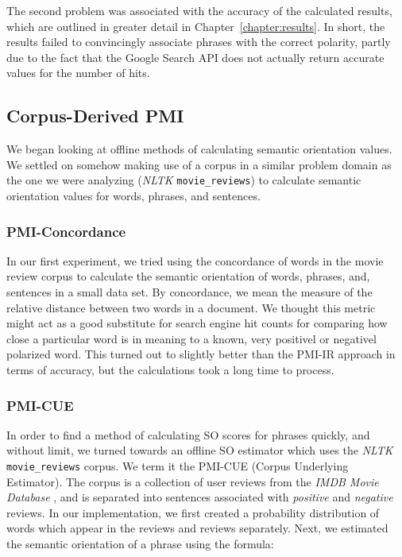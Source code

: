 \documentclass[11pt]{report} %
\begin{document}
The second problem was associated with the accuracy of the calculated results, which are outlined in greater detail in Chapter~\ref{chapter:results}. In short, the results failed to convincingly associate phrases with the correct polarity, partly due to the fact that the Google Search API does not actually return accurate values for the number of hits.

\subsection{Corpus-Derived PMI}
We began looking at offline methods of calculating semantic orientation values. We settled on somehow making use of a corpus in a similar problem domain as the one we were analyzing (\textit{NLTK} \verb|movie_reviews|) to calculate semantic orientation values for words, phrases, and sentences. 

\subsubsection{PMI-Concordance}
In our first experiment, we tried using the concordance of words in the movie review corpus to calculate the semantic orientation of words, phrases, and, sentences in a small data set. By concordance, we mean the measure of the relative distance between two words in a document. We thought this metric might act as a good substitute for search engine hit counts for comparing how close a particular word is in meaning to a known, very positivel or negativel polarized word. This turned out to slightly better than the PMI-IR approach in terms of accuracy, but the calculations took a  long time to process.

\subsubsection{PMI-CUE}
In order to find a method of calculating SO scores for phrases quickly, and without limit, we turned towards an offline SO estimator which uses the \textit{NLTK} \verb|movie_reviews| corpus. We term it the PMI-CUE (Corpus Underlying Estimator). The corpus is a collection of user reviews from the \textit{IMDB Movie Database} , and is separated into sentences associated with \textit{positive} and \textit{negative} reviews. In our implementation, we first created a probability distribution of words which appear in the  reviews and  reviews separately. Next, we estimated the semantic orientation of a phrase using the formula:
\end{document}
